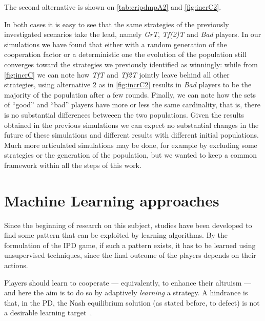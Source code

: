 \documentclass[journal,10pt,twoside]{IEEEtran}
\begin{document}

The second alternative is shown on \autoref{tab:cripdmpA2} and \autoref{fig:incrC2}.

In both cases it is easy to see that the same strategies of the previously investigated scenarios take the lead, namely \textit{GrT}, \textit{Tf(2)T} and \textit{Bad} players. In our simulations we have found that either with a random generation of the cooperation factor or a deterministic one the evolution of the population still converges toward the strategies we previously identified as winningly: while from \autoref{fig:incrC} we can note how \textit{TfT} and \textit{Tf2T} jointly leave behind all other strategies, using alternative 2 as in \autoref{fig:incrC2} results in \textit{Bad} players to be the majority of the population after a few rounds.
Finally, we can note how the sets of ``good'' and ``bad'' players have more or less the same cardinality, that is, there is no substantial differences betweeen the two populations. Given the results obtained in the previous simulations we can expect no substantial changes in the future of these simulations and different results with different initial populations. Much more articulated simulations may be done, for example by excluding some strategies or the generation of the population, but we wanted to keep a common framework within all the steps of this work.

\section{Machine Learning approaches} \label{s:ml}
Since the beginning of research on this subject, studies have been developed to find some pattern that can be exploited by learning algorithms.
By the formulation of the IPD game, if such a pattern exists, it has to be learned using unsupervised techniques, since the final outcome of the players depends on their actions.

Players should learn to cooperate --- equivalently, to enhance their altruism --- and here the aim is to do so by adaptively \textit{learning} a strategy. A hindrance is that, in the PD, the Nash equilibrium solution (as stated before, to defect) is not a desirable learning target~\cite{coopSeqRL}.
\end{document}
